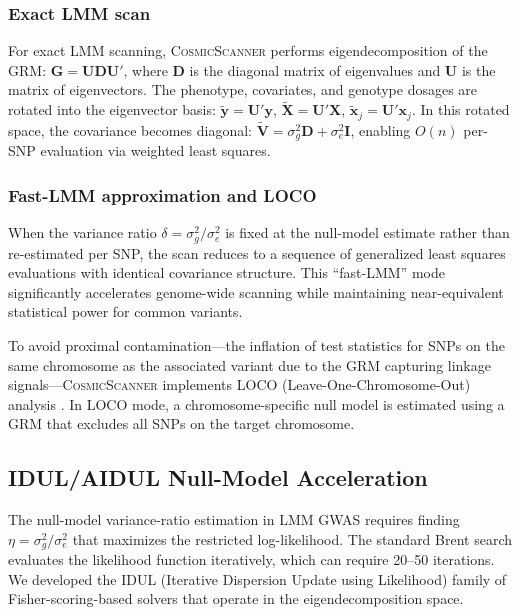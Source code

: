 \documentclass[11pt,a4paper]{article}
\newcommand{\CosmicScanner}{\textsc{CosmicScanner}}
\begin{document}
\subsubsection{Exact LMM scan}

For exact LMM scanning, \CosmicScanner{} performs eigendecomposition of the GRM: $\mathbf{G} = \mathbf{U}\mathbf{D}\mathbf{U}'$, where $\mathbf{D}$ is the diagonal matrix of eigenvalues and $\mathbf{U}$ is the matrix of eigenvectors. The phenotype, covariates, and genotype dosages are rotated into the eigenvector basis: $\tilde{\mathbf{y}} = \mathbf{U}'\mathbf{y}$, $\tilde{\mathbf{X}} = \mathbf{U}'\mathbf{X}$, $\tilde{\mathbf{x}}_j = \mathbf{U}'\mathbf{x}_j$. In this rotated space, the covariance becomes diagonal: $\tilde{\mathbf{V}} = \sigma_g^2 \mathbf{D} + \sigma_e^2 \mathbf{I}$, enabling $O(n)$ per-SNP evaluation via weighted least squares.

\subsubsection{Fast-LMM approximation and LOCO}

When the variance ratio $\delta = \sigma_g^2 / \sigma_e^2$ is fixed at the null-model estimate rather than re-estimated per SNP, the scan reduces to a sequence of generalized least squares evaluations with identical covariance structure. This ``fast-LMM'' mode \citep{lippert2011} significantly accelerates genome-wide scanning while maintaining near-equivalent statistical power for common variants.

To avoid proximal contamination---the inflation of test statistics for SNPs on the same chromosome as the associated variant due to the GRM capturing linkage signals---\CosmicScanner{} implements LOCO (Leave-One-Chromosome-Out) analysis \citep{yang2012cojo}. In LOCO mode, a chromosome-specific null model is estimated using a GRM that excludes all SNPs on the target chromosome.

\subsection{IDUL/AIDUL Null-Model Acceleration}
\label{sec:idul}

The null-model variance-ratio estimation in LMM GWAS requires finding $\eta = \sigma_g^2 / \sigma_e^2$ that maximizes the restricted log-likelihood. The standard Brent search evaluates the likelihood function iteratively, which can require 20--50 iterations. We developed the IDUL (Iterative Dispersion Update using Likelihood) family of Fisher-scoring-based solvers that operate in the eigendecomposition space.
\end{document}
